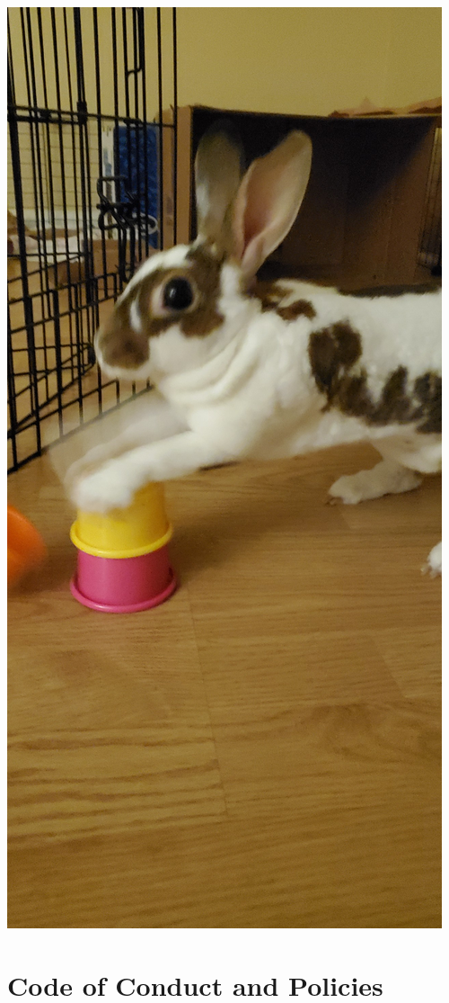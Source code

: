 \documentclass[
]{book}
\begin{document}
\includegraphics{images/nelsonplaying.jpg}

\hypertarget{code-of-conduct-and-policies}{%
\chapter{Code of Conduct and Policies}\label{code-of-conduct-and-policies}}
\end{document}
